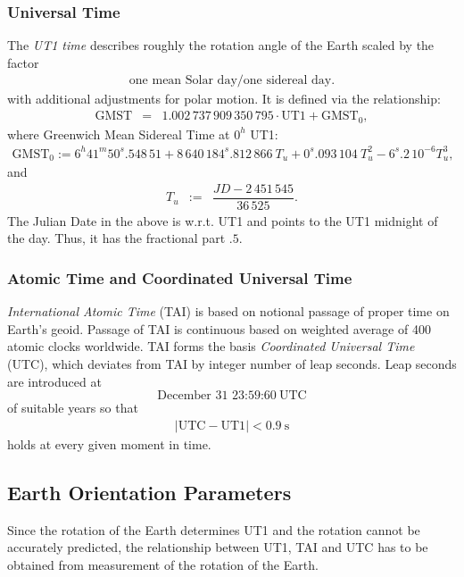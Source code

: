 \documentclass [12pt, a4paper] {article}
\begin{document}
\subsubsection{Universal Time}
The \emph{UT1 time} describes roughly the rotation angle of the Earth scaled by the factor
\begin {eqnarray}
  \textrm{one mean Solar day} / \textrm{one sidereal day}.
\end {eqnarray}
with additional adjustments for polar motion. It is defined via the relationship:
\begin {eqnarray}
\label{eq:gmst}
\textrm{GMST} &=& 1.002\,737\,909\,350\,795\cdot\textrm{UT1} + \textrm{GMST}_0,
\end {eqnarray}
where Greenwich Mean Sidereal Time at $0^h$ UT1:
\begin {eqnarray}
  \label{eq:gmst_0}
  \textrm{GMST}_0 := 6^h41^m50^s.548\,51 + 8\,640\,184^s.812\,866\:T_u + 
  0^s.093\,104\:T_u^2 - 6^s.2\,10^{-6}T_u^3,
\end {eqnarray}
and 
\begin {eqnarray}
  T_u &:=& \dfrac{JD - 2\,451\,545}{36\,525}.
\end {eqnarray}
The Julian Date in the above is w.r.t. UT1 and points to the UT1 midnight of the day. 
Thus, it has the fractional part $.5$.

\subsubsection{Atomic Time and Coordinated Universal Time}
\emph{International Atomic Time} (TAI) is based on notional passage of proper time on 
Earth's geoid. Passage of TAI is continuous based on weighted average of 400 
atomic clocks worldwide. TAI forms the basis \emph{Coordinated Universal Time} (UTC),
which deviates from TAI by integer number of leap seconds. Leap seconds are introduced
at 
\begin {displaymath}
  \textrm{December 31  23:59:60} \:\textrm{UTC}
\end {displaymath}
of suitable years so that 
\begin {eqnarray}
  |\textrm{UTC} - \textrm{UT1}| < 0.9\:\textrm{s}
\end {eqnarray}
holds at every given moment in time.

\subsection{Earth Orientation Parameters}
Since the rotation of the Earth determines UT1 and the rotation cannot be 
accurately predicted, the relationship between UT1, TAI and UTC has to be 
obtained from measurement of the rotation of the Earth. 
\end{document}
